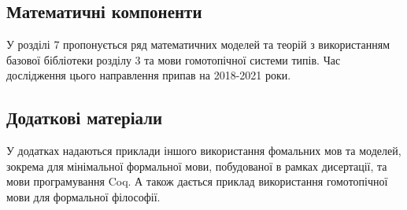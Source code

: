\subsection*{Математичні компоненти}
У розділі 7 пропонується ряд математичних моделей та теорій з використанням
базової бібліотеки розділу 3 та мови гомотопічної системи типів.
Час дослідження цього направлення припав на 2018-2021 роки.

\subsection*{Додаткові матеріали}
У додатках надаються приклади іншого використання фомальних мов та моделей,
зокрема для мінімальної формальної мови, побудованої в рамках дисертації,
та мови програмування Coq. А також дається приклад використання
гомотопічної мови для формальної філософії.
